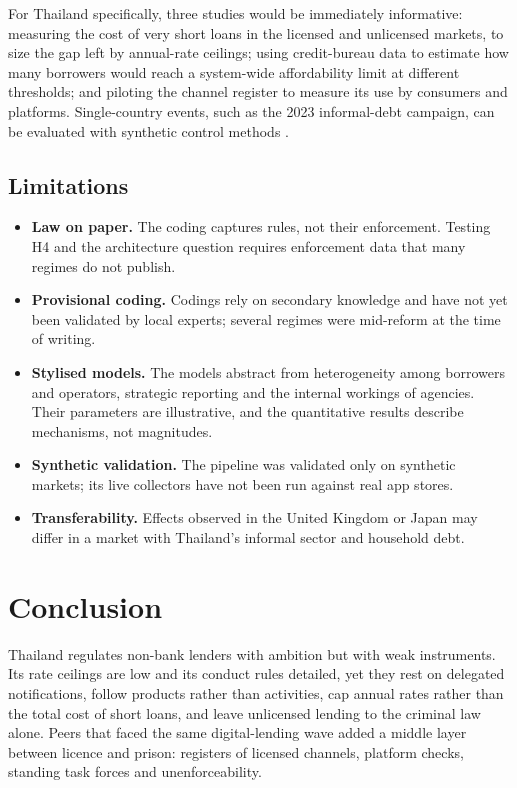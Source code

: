 \documentclass[11pt]{article}
\theoremstyle{plain}
\theoremstyle{definition}
\theoremstyle{remark}
\begin{document}
For Thailand specifically, three studies would be immediately informative: measuring the cost of very short loans in the licensed and unlicensed markets, to size the gap left by annual-rate ceilings; using credit-bureau data to estimate how many borrowers would reach a system-wide affordability limit at different thresholds; and piloting the channel register to measure its use by consumers and platforms. Single-country events, such as the 2023 informal-debt campaign, can be evaluated with synthetic control methods \citep{Abadie2010,Arkhangelsky2021}.

\subsection{Limitations}

\begin{itemize}
\item \textbf{Law on paper.} The coding captures rules, not their enforcement. Testing H4 and the architecture question requires enforcement data that many regimes do not publish.
\item \textbf{Provisional coding.} Codings rely on secondary knowledge and have not yet been validated by local experts; several regimes were mid-reform at the time of writing.
\item \textbf{Stylised models.} The models abstract from heterogeneity among borrowers and operators, strategic reporting and the internal workings of agencies. Their parameters are illustrative, and the quantitative results describe mechanisms, not magnitudes.
\item \textbf{Synthetic validation.} The pipeline was validated only on synthetic markets; its live collectors have not been run against real app stores.
\item \textbf{Transferability.} Effects observed in the United Kingdom or Japan may differ in a market with Thailand's informal sector and household debt.
\end{itemize}

\section{Conclusion}\label{sec:conclusion}

Thailand regulates non-bank lenders with ambition but with weak instruments. Its rate ceilings are low and its conduct rules detailed, yet they rest on delegated notifications, follow products rather than activities, cap annual rates rather than the total cost of short loans, and leave unlicensed lending to the criminal law alone. Peers that faced the same digital-lending wave added a middle layer between licence and prison: registers of licensed channels, platform checks, standing task forces and unenforceability.
\end{document}
